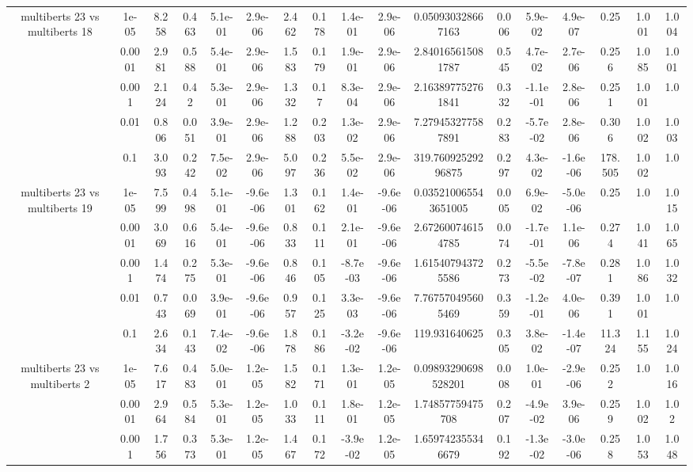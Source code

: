 \begin{tabular}{|c|c|c|c|c|c|c|c|c|c|c|c|c|c|c|c|c|}
\hline
\multirow{5}{*}{multiberts 23 vs multiberts 18} & 1e-05 & 8.258 & 0.463 & 5.1e-01 & 2.9e-06 & 2.462 & 0.178 & 1.4e-01 & 2.9e-06 & 0.050930328667163 & 0.006 & 5.9e-02 & 4.9e-07 & 0.25 & 1.001 & 1.004 \\
 & 0.0001 & 2.981 & 0.588 & 5.4e-01 & 2.9e-06 & 1.583 & 0.179 & 1.9e-01 & 2.9e-06 & 2.840165615081787 & 0.545 & 4.7e-02 & 2.7e-06 & 0.256 & 1.085 & 1.001 \\
 & 0.001 & 2.124 & 0.42 & 5.3e-01 & 2.9e-06 & 1.332 & 0.17 & 8.3e-04 & 2.9e-06 & 2.163897752761841 & 0.332 & -1.1e-01 & 2.8e-06 & 0.251 & 1.001 & 1.0 \\
 & 0.01 & 0.806 & 0.051 & 3.9e-01 & 2.9e-06 & 1.288 & 0.203 & 1.3e-02 & 2.9e-06 & 7.279453277587891 & 0.283 & -5.7e-02 & 2.8e-06 & 0.306 & 1.002 & 1.003 \\
 & 0.1 & 3.093 & 0.242 & 7.5e-02 & 2.9e-06 & 5.097 & 0.236 & 5.5e-02 & 2.9e-06 & 319.76092529296875 & 0.297 & 4.3e-02 & -1.6e-06 & 178.505 & 1.002 & 1.0 \\
\hline
\multirow{5}{*}{multiberts 23 vs multiberts 19} & 1e-05 & 7.599 & 0.498 & 5.1e-01 & -9.6e-06 & 1.301 & 0.162 & 1.4e-01 & -9.6e-06 & 0.035210065543651005 & 0.005 & 6.9e-02 & -5.0e-06 & 0.25 & 1.0 & 1.015 \\
 & 0.0001 & 3.069 & 0.616 & 5.4e-01 & -9.6e-06 & 0.833 & 0.111 & 2.1e-01 & -9.6e-06 & 2.672600746154785 & 0.074 & -1.7e-01 & 1.1e-06 & 0.274 & 1.041 & 1.065 \\
 & 0.001 & 1.474 & 0.275 & 5.3e-01 & -9.6e-06 & 0.846 & 0.105 & -8.7e-03 & -9.6e-06 & 1.615407943725586 & 0.273 & -5.5e-02 & -7.8e-07 & 0.281 & 1.086 & 1.032 \\
 & 0.01 & 0.743 & 0.069 & 3.9e-01 & -9.6e-06 & 0.957 & 0.125 & 3.3e-03 & -9.6e-06 & 7.767570495605469 & 0.359 & -1.2e-01 & 4.0e-06 & 0.391 & 1.001 & 1.0 \\
 & 0.1 & 2.634 & 0.143 & 7.4e-02 & -9.6e-06 & 1.878 & 0.186 & -3.2e-02 & -9.6e-06 & 119.931640625 & 0.305 & 3.8e-02 & -1.4e-07 & 11.324 & 1.155 & 1.024 \\
\hline
\multirow{5}{*}{multiberts 23 vs multiberts 2} & 1e-05 & 7.617 & 0.483 & 5.0e-01 & 1.2e-05 & 1.582 & 0.171 & 1.3e-01 & 1.2e-05 & 0.09893290698528201 & 0.008 & 1.0e-01 & -2.9e-06 & 0.252 & 1.0 & 1.016 \\
 & 0.0001 & 2.964 & 0.584 & 5.3e-01 & 1.2e-05 & 1.033 & 0.111 & 1.8e-01 & 1.2e-05 & 1.74857759475708 & 0.207 & -4.9e-02 & 3.9e-06 & 0.259 & 1.002 & 1.02 \\
 & 0.001 & 1.756 & 0.373 & 5.3e-01 & 1.2e-05 & 1.467 & 0.172 & -3.9e-02 & 1.2e-05 & 1.659742355346679 & 0.192 & -1.3e-02 & -3.0e-06 & 0.258 & 1.053 & 1.048 \\

\end{tabular}
